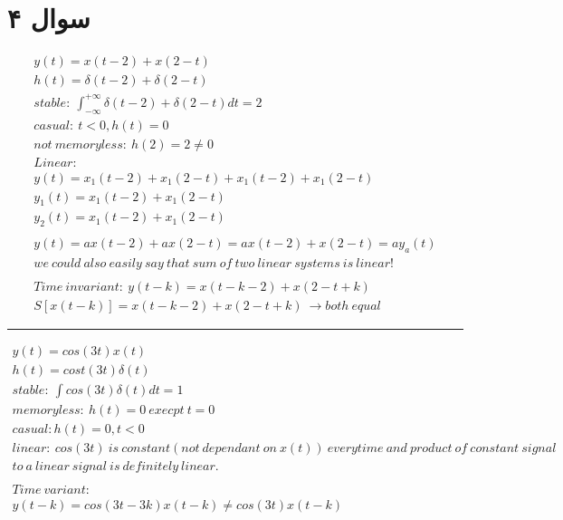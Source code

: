 \documentclass{article}[12pt]
\begin{document}
\section{سوال ۴}
\begin{equation}
	\begin{gathered}
			y( t) =x( t-2) +x( 2-t)\\
			h( t) =\delta ( t-2) +\delta ( 2-t)\\
			stable:\ \int _{-\infty }^{+\infty } \delta ( t-2) +\delta ( 2-t) dt=2\\
			casual:\ t< 0,h( t) =0\\
			not\ memoryless:\ h( 2) =2\neq 0\\
			Linear:\ \\
			y( t) =x_{1}( t-2) +x_{1}( 2-t) +x_{1}( t-2) +x_{1}( 2-t)\\
			y_{1}( t) =x_{1}( t-2) +x_{1}( 2-t)\\
			y_{2}( t) =x_{1}( t-2) +x_{1}( 2-t)\\
			\\
			y( t) =ax( t-2) +ax( 2-t) =ax( t-2) +x( 2-t) =ay_{a}( t)\\
			we\ could\ also\ easily\ say\ that\ sum\ of\ two\ linear\ systems\ is\ linear!\\
			\\
			Time\ invariant:\ y( t-k) =x( t-k-2) +x( 2-t+k)\\
			S[ x( t-k)] =x( t-k-2) +x( 2-t+k) \ \rightarrow both\ equal
	\end{gathered}
\end{equation}\hrule
\begin{equation}
	\begin{gathered}
			y( t) =cos( 3t) x( t)\\
			h( t) =cost( 3t) \delta ( t)\\
			stable:\ \int cos( 3t) \delta ( t) dt=1\\
			memoryless:\ h( t) =0\ execpt\ t=0\\
			casual:h( t) =0,t< 0\\
			linear:\ cos( 3t) \ is\ constant( not\ dependant\ on\ x( t)) \ everytime\ and\ product\ of\ constant\ signal\ \\
			to\ a\ linear\ signal\ is\ definitely\ linear.\ \\
			\\
			Time\ variant:\ \\
			y( t-k) =cos( 3t-3k) x( t-k) \neq cos( 3t) x( t-k)
	\end{gathered}
\end{equation}
\end{document}
